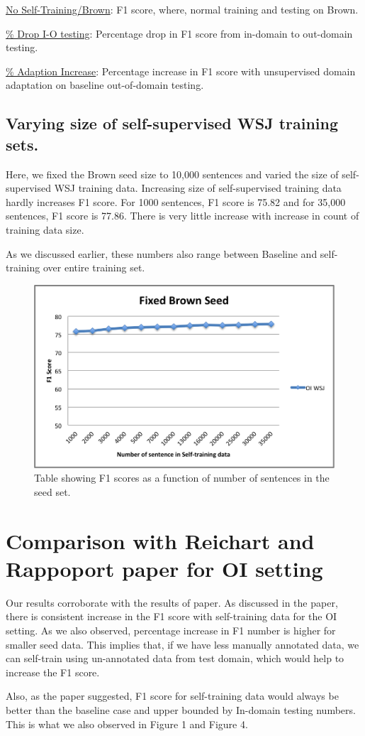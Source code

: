 \underline{No Self-Training/Brown}:  F1 score, where, normal training and testing on Brown. 

\underline{\% Drop I-O testing}: Percentage drop in F1 score from in-domain to out-domain testing.

\underline{\% Adaption Increase}:  Percentage increase in F1 score with unsupervised domain adaptation on baseline out-of-domain testing.

\newpage

\subsection {Varying size of self-supervised WSJ training sets.}

Here, we fixed the Brown seed size to 10,000 sentences and varied the size of self-supervised WSJ training data. Increasing size of self-supervised training data hardly increases F1 score. For 1000 sentences, F1 score is 75.82 and for 35,000 sentences, F1 score is 77.86. There is very little increase with increase in count of training data size.

As we discussed earlier, these numbers also range between Baseline and self-training over entire training set.
\begin{figure}[ht!]
\centering
\includegraphics[width=140mm]{exp4.png}
\caption{Table showing F1 scores as a function of number of sentences in the seed set. }
\label{accuracy}
\end{figure}

\section{Comparison with Reichart and Rappoport paper for OI setting}

Our results corroborate with the results of paper. As discussed in the paper, there is consistent increase in the F1 score with self-training data for the OI setting. As we also observed, percentage increase in F1 number is higher for smaller seed data. This implies that, if we have less manually annotated data, we can self-train using un-annotated data from test domain, which would help to increase the F1 score.

Also, as the paper suggested, F1 score for self-training data would always be better than the baseline case and upper bounded by In-domain testing numbers. This is what we also observed in Figure 1 and Figure 4.



